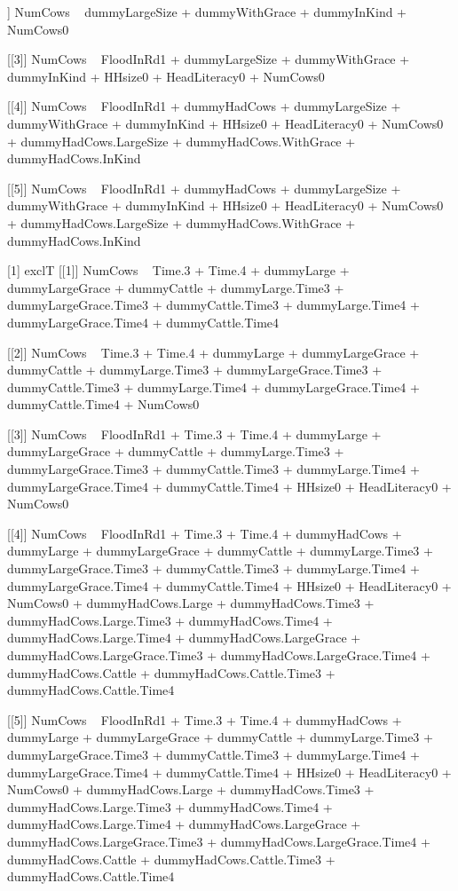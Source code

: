 \begin{Schunk}
\begin{Soutput}
[[2]]
NumCows ~ dummyLargeSize + dummyWithGrace + dummyInKind + NumCows0

[[3]]
NumCows ~ FloodInRd1 + dummyLargeSize + dummyWithGrace + dummyInKind + 
    HHsize0 + HeadLiteracy0 + NumCows0

[[4]]
NumCows ~ FloodInRd1 + dummyHadCows + dummyLargeSize + dummyWithGrace + 
    dummyInKind + HHsize0 + HeadLiteracy0 + NumCows0 + dummyHadCows.LargeSize + 
    dummyHadCows.WithGrace + dummyHadCows.InKind

[[5]]
NumCows ~ FloodInRd1 + dummyHadCows + dummyLargeSize + dummyWithGrace + 
    dummyInKind + HHsize0 + HeadLiteracy0 + NumCows0 + dummyHadCows.LargeSize + 
    dummyHadCows.WithGrace + dummyHadCows.InKind

[1] exclT
[[1]]
NumCows ~ Time.3 + Time.4 + dummyLarge + dummyLargeGrace + dummyCattle + 
    dummyLarge.Time3 + dummyLargeGrace.Time3 + dummyCattle.Time3 + 
    dummyLarge.Time4 + dummyLargeGrace.Time4 + dummyCattle.Time4

[[2]]
NumCows ~ Time.3 + Time.4 + dummyLarge + dummyLargeGrace + dummyCattle + 
    dummyLarge.Time3 + dummyLargeGrace.Time3 + dummyCattle.Time3 + 
    dummyLarge.Time4 + dummyLargeGrace.Time4 + dummyCattle.Time4 + 
    NumCows0

[[3]]
NumCows ~ FloodInRd1 + Time.3 + Time.4 + dummyLarge + dummyLargeGrace + 
    dummyCattle + dummyLarge.Time3 + dummyLargeGrace.Time3 + 
    dummyCattle.Time3 + dummyLarge.Time4 + dummyLargeGrace.Time4 + 
    dummyCattle.Time4 + HHsize0 + HeadLiteracy0 + NumCows0

[[4]]
NumCows ~ FloodInRd1 + Time.3 + Time.4 + dummyHadCows + dummyLarge + 
    dummyLargeGrace + dummyCattle + dummyLarge.Time3 + dummyLargeGrace.Time3 + 
    dummyCattle.Time3 + dummyLarge.Time4 + dummyLargeGrace.Time4 + 
    dummyCattle.Time4 + HHsize0 + HeadLiteracy0 + NumCows0 + 
    dummyHadCows.Large + dummyHadCows.Time3 + dummyHadCows.Large.Time3 + 
    dummyHadCows.Time4 + dummyHadCows.Large.Time4 + dummyHadCows.LargeGrace + 
    dummyHadCows.LargeGrace.Time3 + dummyHadCows.LargeGrace.Time4 + 
    dummyHadCows.Cattle + dummyHadCows.Cattle.Time3 + dummyHadCows.Cattle.Time4

[[5]]
NumCows ~ FloodInRd1 + Time.3 + Time.4 + dummyHadCows + dummyLarge + 
    dummyLargeGrace + dummyCattle + dummyLarge.Time3 + dummyLargeGrace.Time3 + 
    dummyCattle.Time3 + dummyLarge.Time4 + dummyLargeGrace.Time4 + 
    dummyCattle.Time4 + HHsize0 + HeadLiteracy0 + NumCows0 + 
    dummyHadCows.Large + dummyHadCows.Time3 + dummyHadCows.Large.Time3 + 
    dummyHadCows.Time4 + dummyHadCows.Large.Time4 + dummyHadCows.LargeGrace + 
    dummyHadCows.LargeGrace.Time3 + dummyHadCows.LargeGrace.Time4 + 
    dummyHadCows.Cattle + dummyHadCows.Cattle.Time3 + dummyHadCows.Cattle.Time4


\end{Soutput}
\end{Schunk}
